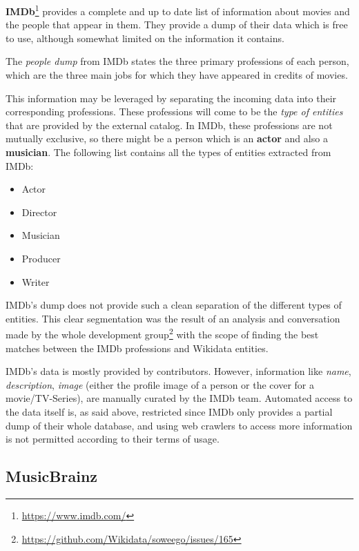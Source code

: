 \documentclass[epsfig,a4paper,11pt,titlepage,twoside,openany]{book}
\newcommand{\footurl}[1]{\footnote{\url{#1}}}
\begin{document}
\textbf{IMDb}\footurl{https://www.imdb.com/} provides a complete and up to date list of information about movies and the people that appear in them. They provide a dump of their data which is free to use, although somewhat limited on the information it contains.

The \textit{people dump} from IMDb states the three primary professions of each person, which are the three main jobs for which they have appeared in credits of movies. 


This information may be leveraged by separating the incoming data into their corresponding professions. These professions will come to be the \textit{type of entities} that are provided by the external catalog. In IMDb, these professions are not mutually exclusive, so there might be a person which is an \textbf{actor} and also a \textbf{musician}. The following list contains all the types of entities extracted from IMDb: 

\begin{itemize}
\item Actor
\item Director
\item Musician
\item Producer
\item Writer
\end{itemize}

IMDb’s dump does not provide such a clean separation of the different types of entities. This clear segmentation was the result of an analysis and conversation made by the whole development group\footurl{https://github.com/Wikidata/soweego/issues/165} with the scope of finding the best matches between the IMDb professions and Wikidata entities.

IMDb’s data is mostly provided by contributors. However, information like \textit{name}, \textit{description}, \textit{image} (either the profile image of a person or the cover for a movie/TV-Series), are manually curated by the IMDb team. Automated access to the data itself is, as said above, restricted since IMDb only provides a partial dump of their whole database, and using web crawlers to access more information is not permitted according to their terms of usage.



\subsection{MusicBrainz}
\label{sec:catalog-musicbrainz}
\end{document}
